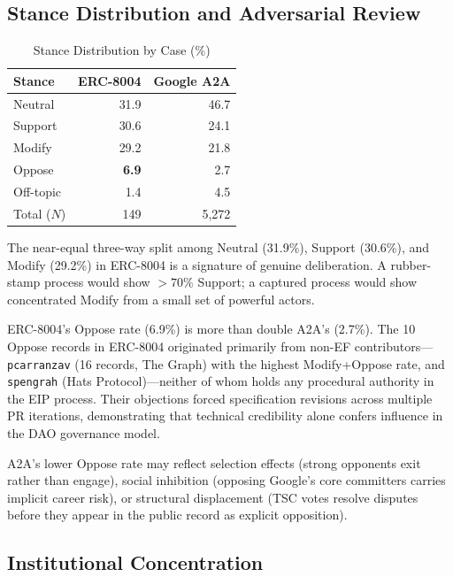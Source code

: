\documentclass[conference]{IEEEtran}
\begin{document}
\subsection{Stance Distribution and Adversarial Review}

\begin{table}[h]
\caption{Stance Distribution by Case (\%)}
\label{tab:stance}
\centering
\begin{tabular}{lrr}
\toprule
\textbf{Stance} & \textbf{ERC-8004} & \textbf{Google A2A} \\
\midrule
Neutral  & 31.9 & 46.7 \\
Support  & 30.6 & 24.1 \\
Modify   & 29.2 & 21.8 \\
Oppose   & \textbf{6.9} & 2.7 \\
Off-topic & 1.4 & 4.5 \\
\midrule
Total ($N$) & 149 & 5,272 \\
\bottomrule
\end{tabular}
\end{table}

The near-equal three-way split among Neutral (31.9\%), Support (30.6\%),
and Modify (29.2\%) in ERC-8004 is a signature of genuine deliberation.
A rubber-stamp process would show $>70\%$ Support; a captured process
would show concentrated Modify from a small set of powerful actors.

ERC-8004's Oppose rate (6.9\%) is more than double A2A's (2.7\%). The
10 Oppose records in ERC-8004 originated primarily from non-EF contributors---
\texttt{pcarranzav} (16 records, The Graph) with the highest Modify+Oppose rate,
and \texttt{spengrah} (Hats Protocol)---neither of whom holds any procedural
authority in the EIP process. Their objections forced specification revisions
across multiple PR iterations, demonstrating that technical credibility alone
confers influence in the DAO governance model.

A2A's lower Oppose rate may reflect selection effects (strong opponents
exit rather than engage), social inhibition (opposing Google's core
committers carries implicit career risk), or structural displacement
(TSC votes resolve disputes before they appear in the public record
as explicit opposition).

\subsection{Institutional Concentration}
\end{document}
